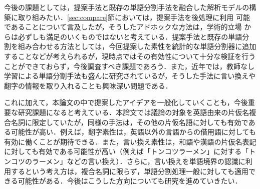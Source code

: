 \documentclass[japanese]{jnlp_1.4}
\begin{document}
今後の課題としては，提案手法と既存の単語分割手法を融合した解析モデルの構
築に取り組みたい．\ref{sec:compare}節においては，提案手法を後処理に利用
可能であることについて言及したが，そうしたアドホックな方法は，学術的立場
からは必ずしも満足のいくものではないと考えている．提案手法と既存の単語分
割を組み合わせる方法としては，今回提案した素性を統計的な単語分割器に追加
することなどが考えられるが，現時点ではその有効性について十分な検証を行う
ことができておらず，今後調査すべき課題であろう．また，近年では，教師なし
学習による単語分割手法も盛んに研究されているが，そうした手法に言い換えや
翻字の情報を取り入れることも興味深い問題である\cite{Mochihashi09}．

これに加えて，本論文の中で提案したアイデアを一般化していくことも，今後重
要な研究課題になると考えている．本論文では議論の対象を英語由来の片仮名複
合名詞に限定していたが，同様の手法は，その他の片仮名語に対しても有効であ
る可能性が高い．例えば，翻字素性は，英語以外の言語からの借用語に対しても
有効に働くことが期待できる．また，言い換え素性は，和語や漢語の片仮名表記
に対しても有効である可能性が高い（例えば「トンコツラーメン」に対する「ト
ンコツのラーメン」などの言い換え）．さらに，言い換えを単語境界の認識に利
用するという考え方は，複合名詞に限らず，単語分割処理一般に対しても適用で
きる可能性がある．今後はこうした方向についても研究を進めていきたい．
\end{document}
